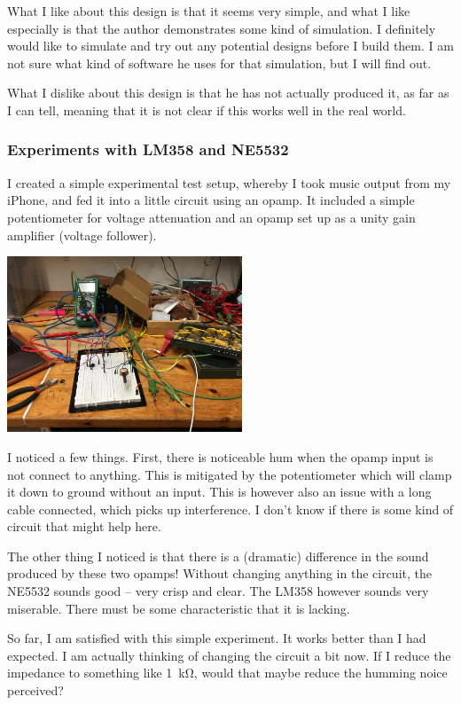 \documentclass[a4paper]{article}
\begin{document}
What I like about this design is that it seems very simple, and what I like especially is that the author demonstrates some kind of simulation. I definitely would like to simulate and try out any potential designs before I build them. I am not sure what kind of software he uses for that simulation, but I will find out. 

What I dislike about this design is that he has not actually produced it, as far as I can tell, meaning that it is not clear if this works well in the real world.

\subsubsection{Experiments with LM358 and NE5532}

I created a simple experimental test setup, whereby I took music output from my iPhone, and fed it into a little circuit using an opamp. It included a simple potentiometer for voltage attenuation and an opamp set up as a unity gain amplifier (voltage follower). 

\begin{center}
\includegraphics[width=7cm]{images/IMG_7757}  
\end{center}


I noticed a few things. First, there is noticeable hum when the opamp input is not connect to anything. This is mitigated by the potentiometer which will clamp it down to ground without an input. This is however also an issue with a long cable connected, which picks up interference. I don't know if there is some kind of circuit that might help here.

The other thing I noticed is that there is a (dramatic) difference in the sound produced by these two opamps! Without changing anything in the circuit, the NE5532 sounds good -- very crisp and clear. The LM358 however sounds very miserable. There must be some characteristic that it is lacking.

So far, I am satisfied with this simple experiment. It works better than I had expected. I am actually thinking of changing the circuit a bit now. If I reduce the impedance to something like \SI{1}{\kilo\ohm}, would that maybe reduce the humming noice perceived?
\end{document}
